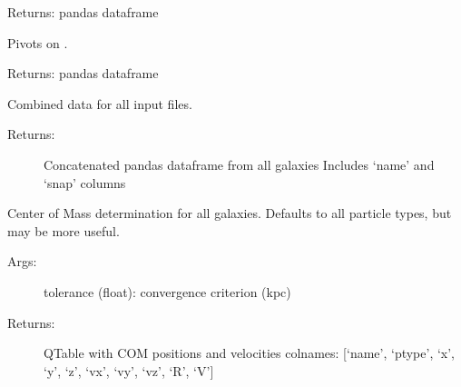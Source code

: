 \documentclass[letterpaper,10pt,english]{sphinxmanual}
\begin{document}
\begin{fulllineitems}
\begin{fulllineitems}
Returns: pandas dataframe

\end{fulllineitems}


\begin{fulllineitems}
\label{\detokenize{galaxies:galaxy.galaxies.Galaxies.get_masses_pivot}}
Pivots on .

Returns: pandas dataframe

\end{fulllineitems}


\begin{fulllineitems}
\label{\detokenize{galaxies:galaxy.galaxies.Galaxies.get_full_df}}
Combined data for all input files.
\begin{description}
\item[{Returns:}] \leavevmode
Concatenated pandas dataframe from all galaxies
Includes ‘name’ and ‘snap’ columns

\end{description}

\end{fulllineitems}


\begin{fulllineitems}
\label{\detokenize{galaxies:galaxy.galaxies.Galaxies.get_coms}}
Center of Mass determination for all galaxies. 
Defaults to all particle types, but  may be more useful.
\begin{description}
\item[{Args:}] \leavevmode
tolerance (float): convergence criterion (kpc)

\item[{Returns:}] \leavevmode
QTable with COM positions and velocities
colnames: {[}‘name’, ‘ptype’, ‘x’, ‘y’, ‘z’, ‘vx’, ‘vy’, ‘vz’, ‘R’, ‘V’{]}


\end{description}
\end{fulllineitems}
\end{fulllineitems}
\end{document}
